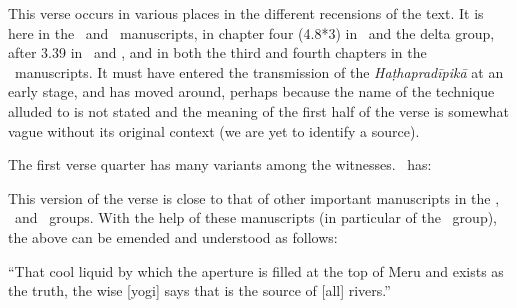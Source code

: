 \begin{ekdosis}
\begin{philcomm}[hp03_049_2]
This verse occurs in various places in the different recensions of the text. It is here in the \alphaTwo\ and \alphaThree\ manuscripts, in chapter four (4.8*3) in \alphaOne\ and the delta group, after 3.39 in \betaOne\ and \betaTwo, and in both the third and fourth chapters in the \textgamma\ manuscripts. It must have entered the transmission of the \emph{Haṭhapradīpikā} at an early stage, and has moved around, perhaps because the name of the technique alluded to is not stated and the meaning of the first half of the verse is somewhat vague without its original context (we are yet to identify a source).

The first verse quarter has many variants among the witnesses. \alphaTwo\ has:
\begin{versinnote}
\end{versinnote}
This version of the verse is close to that of other important manuscripts in the \textbeta, \textgamma\ and \texteta\ groups. With the help of these manuscripts (in particular  of the \textgamma\ group), the above can be emended and understood as follows:
\begin{versinnote}
\tl{\var{°suṣiraṃ ] \getsiglum{K1}, °sukhire \alphaTwo. °mūrdhny ] \getsiglum{P8}. °mūle \alphaTwo. asti tathyaṃ ] \getsiglum{K1}, yad astī \alphaTwo.}\\!}
“That cool liquid by which the aperture is filled at the top of Meru and exists as the truth, the wise [yogi] says that is the source of [all] rivers.” 
\end{versinnote}





\end{philcomm}
\end{ekdosis}
